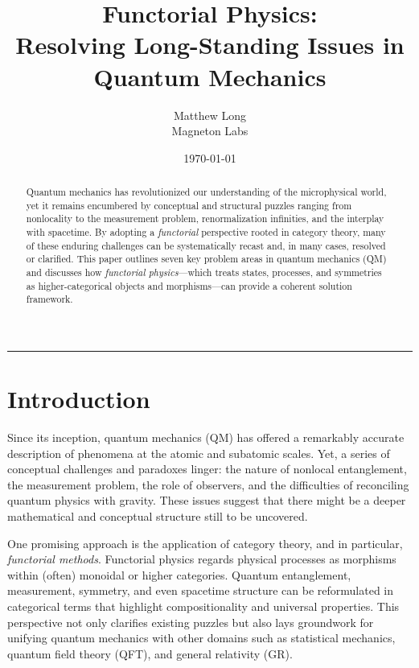 \documentclass[12pt]{article}
\begin{document}
\title{\bf Functorial Physics:\\ Resolving Long-Standing Issues in Quantum Mechanics}
\author{Matthew Long \\
Magneton Labs}
\date{\today}
\maketitle

\begin{abstract}
Quantum mechanics has revolutionized our understanding of the microphysical world, yet it remains encumbered by conceptual and structural puzzles ranging from nonlocality to the measurement problem, renormalization infinities, and the interplay with spacetime. By adopting a \emph{functorial} perspective rooted in category theory, many of these enduring challenges can be systematically recast and, in many cases, resolved or clarified. This paper outlines seven key problem areas in quantum mechanics (QM) and discusses how \emph{functorial physics}---which treats states, processes, and symmetries as higher-categorical objects and morphisms---can provide a coherent solution framework.
\end{abstract}

\vspace{1em}
\hrule
\vspace{1em}

\section{Introduction}
Since its inception, quantum mechanics (QM) has offered a remarkably accurate description of phenomena at the atomic and subatomic scales. Yet, a series of conceptual challenges and paradoxes linger: the nature of nonlocal entanglement, the measurement problem, the role of observers, and the difficulties of reconciling quantum physics with gravity. These issues suggest that there might be a deeper mathematical and conceptual structure still to be uncovered.

One promising approach is the application of category theory, and in particular, \emph{functorial methods}. Functorial physics regards physical processes as morphisms within (often) monoidal or higher categories. Quantum entanglement, measurement, symmetry, and even spacetime structure can be reformulated in categorical terms that highlight compositionality and universal properties. This perspective not only clarifies existing puzzles but also lays groundwork for unifying quantum mechanics with other domains such as statistical mechanics, quantum field theory (QFT), and general relativity (GR).
\end{document}
